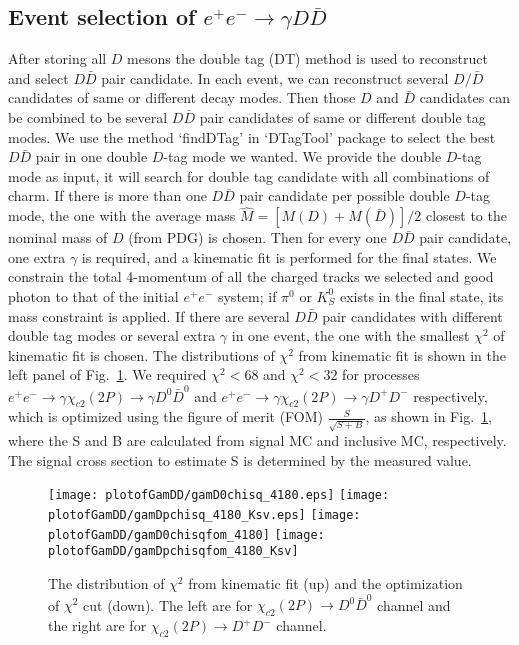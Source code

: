 \documentclass[aps,preprint,tightenlines,superscriptaddress,showpacs,byrevtex,amsmath,amssymb,nofloatfix]{revtex4}
\begin{document}
\subsection{Event selection of $e^{+}e^{-}\rightarrow\gamma  D\bar{D}$}
  After storing all $D$ mesons the double tag (DT) method is used to reconstruct and select $D\bar{D}$ pair candidate. In each event, we can reconstruct several $D/\bar{D}$ candidates of same or different decay modes. Then those $D$ and $\bar{D}$ candidates can be combined to be several $D\bar{D}$ pair candidates of same or different double tag modes.  We use the method `findDTag' in `DTagTool' package to select the best $D\bar{D}$ pair in one double $D$-tag mode we wanted. We provide the double $D$-tag mode as input, it will search for double tag candidate with all combinations of charm. If there is more than one $D\bar{D}$ pair candidate per possible double $D$-tag mode, the one with the average mass $\hat{M} = [M(D) + M(\bar{D})]/2$ closest to the nominal mass of $D$ (from PDG) is chosen.  Then for every one $D\bar{D}$ pair candidate, one extra $\gamma$ is required, and a kinematic fit is performed for the final states. We constrain the total 4-momentum of all the charged tracks we selected and good photon to that of the initial $e^{+}e^{-}$ system; if $\pi^0$ or $K^{0}_S$ exists in the final state, its mass constraint is applied. If there are several $D\bar{D}$ pair candidates with different double tag modes or several extra $\gamma$ in one event, the one with the smallest $\chi^{2}$ of kinematic fit is chosen. The distributions of $\chi^{2}$ from  kinematic fit is shown in the left panel of Fig.~\ref{gammaDDchisq}. We required $\chi^{2}<68$ and $\chi^{2}<32$ for processes $e^{+}e^{-}\rightarrow \gamma \chi_{c2} (2P)\rightarrow \gamma D^{0}\bar{D}^{0}$ and $e^{+}e^{-}\rightarrow \gamma \chi_{c2} (2P)\rightarrow \gamma D^{+}D^{-}$  respectively, which is optimized using the figure of merit (FOM) $\frac{S}{\sqrt{S+B}}$, as shown in Fig.~\ref{gammaDDchisq}, where the S and B are calculated from signal MC and inclusive MC, respectively. The signal cross section to estimate S is determined by the measured value.


\begin{figure}[t]
   \captionsetup{justification=raggedright}
    \texttt{[image: plotofGamDD/gamD0chisq\_4180.eps]}
    \texttt{[image: plotofGamDD/gamDpchisq\_4180\_Ksv.eps]}
    \texttt{[image: plotofGamDD/gamD0chisqfom\_4180]}
    \texttt{[image: plotofGamDD/gamDpchisqfom\_4180\_Ksv]}

  \caption{\small The distribution of $\chi^{2}$ from kinematic fit (up) and the optimization of $\chi^{2}$ cut (down). The left are for $\chi_{c2} (2P)\rightarrow D^{0}\bar{D}^{0}$ channel and the right are for $\chi_{c2} (2P)\rightarrow D^{+}D^{-}$ channel.}
  \label{gammaDDchisq}
\end{figure}
\end{document}
